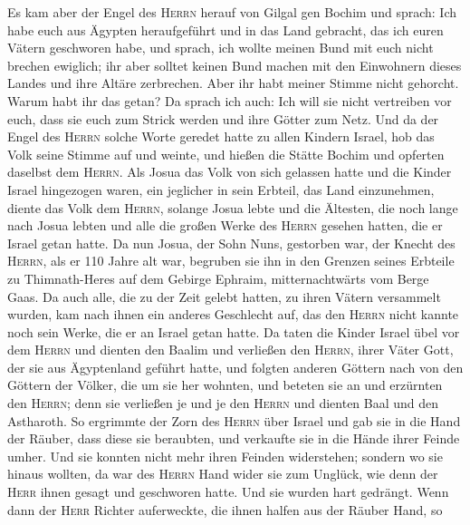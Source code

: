  Es kam aber der Engel des \textsc{Herrn} herauf von
Gilgal gen Bochim und sprach: Ich habe euch aus Ägypten heraufgeführt
und in das Land gebracht, das ich euren Vätern geschworen habe, und
sprach, ich wollte meinen Bund mit euch nicht brechen ewiglich;
 ihr aber solltet keinen Bund machen mit den Einwohnern
dieses Landes und ihre Altäre zerbrechen. Aber ihr habt meiner Stimme
nicht gehorcht. Warum habt ihr das getan?  Da sprach ich
auch: Ich will sie nicht vertreiben vor euch, dass sie euch zum Strick
werden und ihre Götter zum Netz.  Und da der Engel des
\textsc{Herrn} solche Worte geredet hatte zu allen Kindern Israel, hob
das Volk seine Stimme auf und weinte,  und hießen die
Stätte Bochim und opferten daselbst dem \textsc{Herrn}. 
Als Josua das Volk von sich gelassen hatte und die Kinder Israel
hingezogen waren, ein jeglicher in sein Erbteil, das Land einzunehmen,
 diente das Volk dem \textsc{Herrn}, solange Josua lebte
und die Ältesten, die noch lange nach Josua lebten und alle die großen
Werke des \textsc{Herrn} gesehen hatten, die er Israel getan hatte.
 Da nun Josua, der Sohn Nuns, gestorben war, der Knecht
des \textsc{Herrn}, als er 110 Jahre alt war,  begruben
sie ihn in den Grenzen seines Erbteile zu Thimnath-Heres auf dem Gebirge
Ephraim, mitternachtwärts vom Berge Gaas.  Da auch alle,
die zu der Zeit gelebt hatten, zu ihren Vätern versammelt wurden, kam
nach ihnen ein anderes Geschlecht auf, das den \textsc{Herrn} nicht
kannte noch sein Werke, die er an Israel getan hatte.  Da
taten die Kinder Israel übel vor dem \textsc{Herrn} und dienten den
Baalim  und verließen den \textsc{Herrn}, ihrer Väter
Gott, der sie aus Ägyptenland geführt hatte, und folgten anderen Göttern
nach von den Göttern der Völker, die um sie her wohnten, und beteten sie
an und erzürnten den \textsc{Herrn};  denn sie verließen
je und je den \textsc{Herrn} und dienten Baal und den Astharoth.
 So ergrimmte der Zorn des \textsc{Herrn} über Israel und
gab sie in die Hand der Räuber, dass diese sie beraubten, und verkaufte
sie in die Hände ihrer Feinde umher. Und sie konnten nicht mehr ihren
Feinden widerstehen;  sondern wo sie hinaus wollten, da
war des \textsc{Herrn} Hand wider sie zum Unglück, wie denn der
\textsc{Herr} ihnen gesagt und geschworen hatte. Und sie wurden hart
gedrängt.  Wenn dann der \textsc{Herr} Richter
auferweckte, die ihnen halfen aus der Räuber Hand,  so
